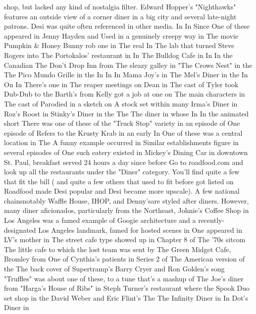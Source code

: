 \documentclass[12pt]{book}
\begin{document}
shop, but lacked any kind of nostalgia filter. Edward Hopper's "Nighthawks" features an outside view of a corner diner in a big city and several late-night patrons. Desi was quite often referenced in other media. In In Since One of these appeared in Jenny Hayden and Used in a genuinely creepy way in The movie Pumpkin \& Honey Bunny rob one in The real In The lab that turned Steve Rogers into The Portokalos' restaurant in In The Bulldog Cafe in In In the Canadian The Don't Drop Inn from The sleazy galley in "The Crows Nest" in the The Pico Mundo Grille in the In In In Mama Joy's in The Mel's Diner in the In On In There's one in The reaper meetings on Dean in The cast of Tyler took Dub-Dub to the Barth's from Kelly got a job at one on The main characters in The cast of Parodied in a sketch on A stock set within many Irma's Diner in Roz's Roost in Stinky's Diner in the The The diner in whose In In the animated short There was one of these of the "Truck Stop" variety in an episode of One episode of Refers to the Krusty Krab in an early In One of these was a central location in The A funny example occurred in Similar establishments figure in several episodes of One such eatery existed in Mickey's Dining Car in downtown St. Paul, breakfast served 24 hours a day since before Go to roadfood.com and look up all the restaurants under the "Diner" category. You'll find quite a few that fit the bill ( and quite a few others that used to fit before got listed on Roadfood made Desi popular and Desi became more upscale). A few national chainsnotably Waffle House, IHOP, and Denny'sare styled after diners. However, many diner aficionados, particularly from the Northeast, Johnie's Coffee Shop in Los Angeles was a famed example of Googie architecture and a recently-designated Los Angeles landmark, famed for hosted scenes in One appeared in LV's mother in The street cafe type showed up in Chapter 8 of The '70s sitcom The little cafe to which the lost team was sent by The Green Midget Cafe, Bromley from One of Cynthia's patients in Series 2 of The American version of the The back cover of Supertramp's Barry Cryer and Ron Golden's song "Truffles" was about one of these, to a tune that's a mashup of The Joe's diner from "Harga's House of Ribs" in Steph Turner's restaurant where the Spook Duo set shop in the David Weber and Eric Flint's The The Infinity Diner in In Dot's Diner in
\end{document}
